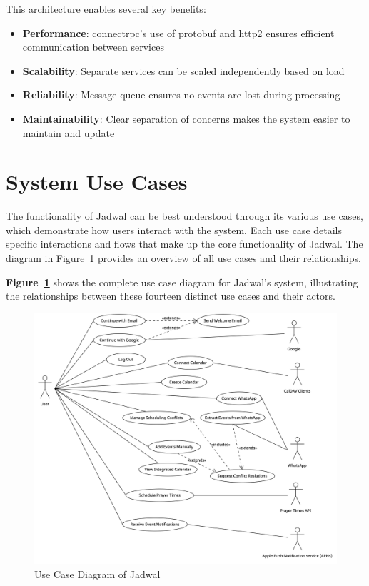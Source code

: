 This architecture enables several key benefits:

\begin{itemize}
    \item \textbf{Performance}: \gls{connectrpc}'s use of \gls{protobuf} and \gls{http2} ensures efficient communication between services
    \item \textbf{Scalability}: Separate services can be scaled independently based on load
    \item \textbf{Reliability}: Message queue ensures no events are lost during processing
    \item \textbf{Maintainability}: Clear separation of concerns makes the system easier to maintain and update
\end{itemize}

\section{System Use Cases}
The functionality of Jadwal can be best understood through its various use cases, which demonstrate how users interact with the system. Each use case details specific interactions and flows that make up the core functionality of Jadwal. The diagram in Figure~\ref{fig:use-case-diagram} provides an overview of all use cases and their relationships.

\textbf{Figure~\ref{fig:use-case-diagram}} shows the complete use case diagram for Jadwal's system, illustrating the relationships between these fourteen distinct use cases and their actors.

\begin{figure}[!h]
    \centering
    \includegraphics[width=\textwidth]{images/use-case-diagram.png}
    \caption{Use Case Diagram of Jadwal}
    \label{fig:use-case-diagram}
\end{figure}

